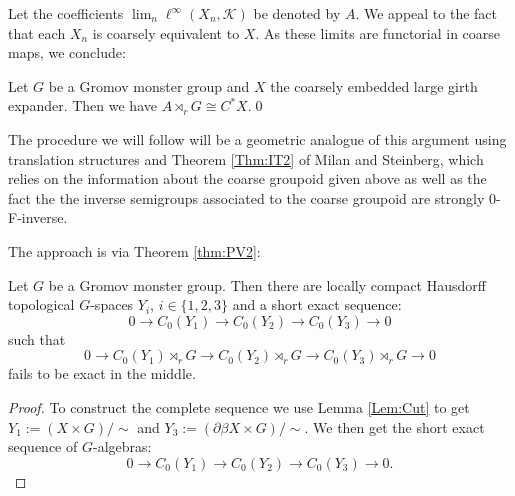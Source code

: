 \begin{example}
Let the coefficients $\lim_{n}\ell^{\infty}(X_{n},\mathcal{K})$ be denoted by $A$. We appeal to the fact that each $X_{n}$ is coarsely equivalent to $X$. As these limits are functorial in coarse maps, we conclude:

\begin{proposition}
Let $G$ be a Gromov monster group and $X$ the coarsely embedded large girth expander. Then we have $A\rtimes_{r} G \cong C^{*}X$.\qed
\end{proposition}

The procedure we will follow will be a geometric analogue of this argument using translation structures and Theorem \ref{Thm:IT2} of Milan and Steinberg, which relies on the information about the coarse groupoid given above as well as the fact the the inverse semigroups associated to the coarse groupoid are strongly 0-F-inverse.

The approach is via Theorem \ref{thm:PV2}:

\begin{theorem}\label{Thm:GM1}
Let $G$ be a Gromov monster group. Then there are locally compact Hausdorff topological $G$-spaces $Y_{i}$, $i \in \lbrace 1,2,3 \rbrace$ and a short exact sequence:
\begin{equation*}
0 \rightarrow C_{0}(Y_{1}) \rightarrow C_{0}(Y_{2}) \rightarrow C_{0}(Y_{3}) \rightarrow 0
\end{equation*}
such that
\begin{equation*}
0 \rightarrow C_{0}(Y_{1})\rtimes_{r} G \rightarrow C_{0}(Y_{2})\rtimes_{r} G \rightarrow C_{0}(Y_{3})\rtimes_{r} G \rightarrow 0
\end{equation*}
fails to be exact in the middle.
\end{theorem}
\begin{proof}
To construct the complete sequence we use Lemma \ref{Lem:Cut} to get $Y_{1}:= (X \times G)/\sim$ and $Y_{3}:= (\partial\beta X \times G)/\sim$. We then get the short exact sequence of $G$-algebras:
\begin{equation*}
0 \rightarrow C_{0}(Y_{1}) \rightarrow C_{0}(Y_{2}) \rightarrow C_{0}(Y_{3}) \rightarrow 0.
\end{equation*}


\end{proof}
\end{example}

